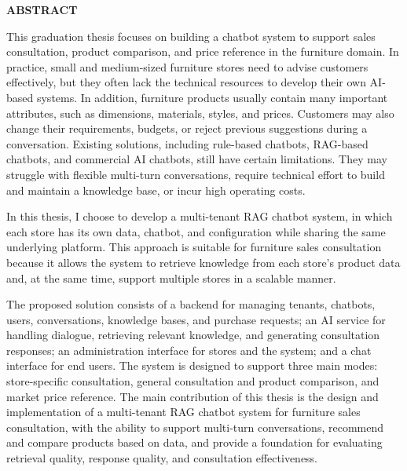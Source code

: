 \documentclass[../DoAn.tex]{subfiles}
\begin{document}
\begin{center}
    \Large{\textbf{ABSTRACT}}\\
\end{center}
\vspace{1cm}
This graduation thesis focuses on building a chatbot system to support sales consultation, product comparison, and price reference in the furniture domain. In practice, small and medium-sized furniture stores need to advise customers effectively, but they often lack the technical resources to develop their own AI-based systems. In addition, furniture products usually contain many important attributes, such as dimensions, materials, styles, and prices. Customers may also change their requirements, budgets, or reject previous suggestions during a conversation. Existing solutions, including rule-based chatbots, RAG-based chatbots, and commercial AI chatbots, still have certain limitations. They may struggle with flexible multi-turn conversations, require technical effort to build and maintain a knowledge base, or incur high operating costs.

In this thesis, I choose to develop a multi-tenant RAG chatbot system, in which each store has its own data, chatbot, and configuration while sharing the same underlying platform. This approach is suitable for furniture sales consultation because it allows the system to retrieve knowledge from each store’s product data and, at the same time, support multiple stores in a scalable manner.

The proposed solution consists of a backend for managing tenants, chatbots, users, conversations, knowledge bases, and purchase requests; an AI service for handling dialogue, retrieving relevant knowledge, and generating consultation responses; an administration interface for stores and the system; and a chat interface for end users. The system is designed to support three main modes: store-specific consultation, general consultation and product comparison, and market price reference. The main contribution of this thesis is the design and implementation of a multi-tenant RAG chatbot system for furniture sales consultation, with the ability to support multi-turn conversations, recommend and compare products based on data, and provide a foundation for evaluating retrieval quality, response quality, and consultation effectiveness.
\end{document}
